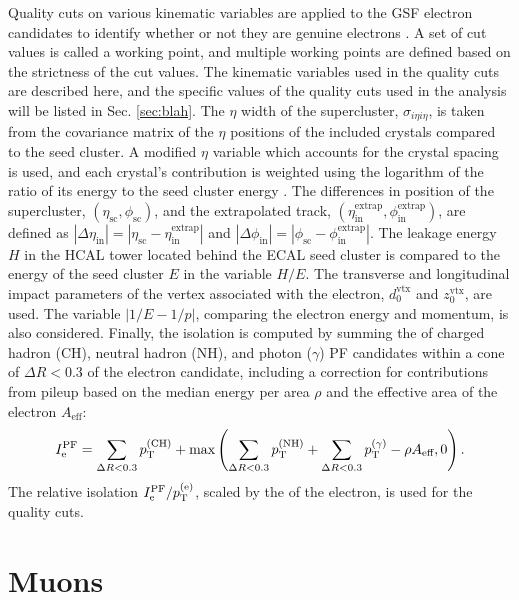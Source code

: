 Quality cuts on various kinematic variables are applied to the GSF electron candidates to identify whether or not they are genuine electrons \cite{ElectronCutBased}. A set of cut values is called a working point, and multiple working points are defined based on the strictness of the cut values. The kinematic variables used in the quality cuts are described here, and the specific values of the quality cuts used in the analysis will be listed in Sec. \ref{sec:blah}. The $\eta$ width of the supercluster, $\sigma_{i\eta i\eta}$, is taken from the covariance matrix of the $\eta$ positions of the included crystals compared to the seed cluster. A modified $\eta$ variable which accounts for the crystal spacing is used, and each crystal's contribution is weighted using the logarithm of the ratio of its energy to the seed cluster energy \cite{EgammaShowerShape}. The differences in position of the supercluster, $(\eta_{\text{sc}},\phi_{\text{sc}})$, and the extrapolated track, $(\eta_{\text{in}}^{\text{extrap}},\phi_{\text{in}}^{\text{extrap}})$, are defined as $|\Delta \eta_{\text{in}}| = |\eta_{\text{sc}} - \eta_{\text{in}}^{\text{extrap}}|$ and $|\Delta \phi_{\text{in}}| = |\phi_{\text{sc}} - \phi_{\text{in}}^{\text{extrap}}|$. The leakage energy $H$ in the HCAL tower located behind the ECAL seed cluster is compared to the energy of the seed cluster $E$ in the variable $H/E$. The transverse and longitudinal impact parameters of the vertex associated with the electron, $d_{0}^{\text{vtx}}$ and $z_{0}^{\text{vtx}}$, are used. The variable $|1/E - 1/p|$, comparing the electron energy and momentum, is also considered. Finally, the isolation is computed by summing the \pt of charged hadron (CH), neutral hadron (NH), and photon ($\gamma$) PF candidates within a cone of $\Delta R < 0.3$ of the electron candidate, including a correction for contributions from pileup based on the median energy per area $\rho$ and the effective area of the electron $A_{\text{eff}}$:
\begin{equation}
I^{\text{PF}}_{\mathrm{e}} = \sum_{\Delta R < 0.3}{p_{\mathrm{T}}^{(\text{CH})}} + \text{max}\left( \sum_{\Delta R < 0.3}{p_{\mathrm{T}}^{(\text{NH})}} + \sum_{\Delta R < 0.3}{p_{\mathrm{T}}^{(\gamma)}} - \rho A_{\text{eff}}, 0 \right).
\end{equation}
The relative isolation $I^{\text{PF}}_{\mathrm{e}}/p_{\mathrm{T}}^{(\mathrm{e})}$, scaled by the \pt of the electron, is used for the quality cuts.

\section{Muons}

